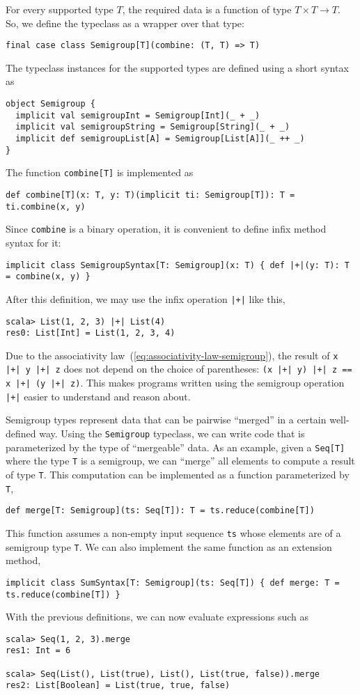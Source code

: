 For every supported type $T$, the required data is a function of
type $T\times T\rightarrow T$. So, we define the typeclass as a wrapper
over that type:
\begin{lstlisting}
final case class Semigroup[T](combine: (T, T) => T)
\end{lstlisting}
The typeclass instances for the supported types are defined using
a short syntax as
\begin{lstlisting}
object Semigroup {
  implicit val semigroupInt = Semigroup[Int](_ + _)
  implicit val semigroupString = Semigroup[String](_ + _)
  implicit def semigroupList[A] = Semigroup[List[A]](_ ++ _)
}
\end{lstlisting}
The function \lstinline!combine[T]! is implemented as
\begin{lstlisting}
def combine[T](x: T, y: T)(implicit ti: Semigroup[T]): T = ti.combine(x, y)
\end{lstlisting}
Since \lstinline!combine! is a binary operation, it is convenient
to define infix method syntax for it:
\begin{lstlisting}
implicit class SemigroupSyntax[T: Semigroup](x: T) { def |+|(y: T): T = combine(x, y) }
\end{lstlisting}
After this definition, we may use the infix operation \lstinline!|+|!
like this,
\begin{lstlisting}
scala> List(1, 2, 3) |+| List(4)
res0: List[Int] = List(1, 2, 3, 4)
\end{lstlisting}
Due to the associativity law~(\ref{eq:associativity-law-semigroup}),
the result of \lstinline!x |+| y |+| z! does not depend on the choice
of parentheses: \lstinline!(x |+| y) |+| z == x |+| (y |+| z)!. This
makes programs written using the semigroup operation \lstinline!|+|!
easier to understand and reason about.

Semigroup types represent data that can be pairwise ``merged'' in
a certain well-defined way. Using the \lstinline!Semigroup! typeclass,
we can write code that is parameterized by the type of ``mergeable''
data. As an example, given a \lstinline!Seq[T]! where the type \lstinline!T!
is a semigroup, we can ``merge'' all elements to compute a result
of type \lstinline!T!. This computation can be implemented as a function
parameterized by \lstinline!T!,
\begin{lstlisting}
def merge[T: Semigroup](ts: Seq[T]): T = ts.reduce(combine[T])
\end{lstlisting}
This function assumes a non-empty input sequence \lstinline!ts! whose
elements are of a semigroup type \lstinline!T!. We can also implement
the same function as an extension method,
\begin{lstlisting}
implicit class SumSyntax[T: Semigroup](ts: Seq[T]) { def merge: T = ts.reduce(combine[T]) }
\end{lstlisting}
With the previous definitions, we can now evaluate expressions such
as
\begin{lstlisting}
scala> Seq(1, 2, 3).merge
res1: Int = 6

scala> Seq(List(), List(true), List(), List(true, false)).merge
res2: List[Boolean] = List(true, true, false)
\end{lstlisting}

